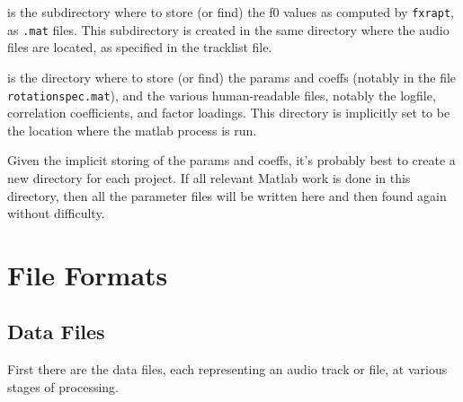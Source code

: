 \documentclass[11pt]{article}
\begin{document}
\begin{description}  \setlength{\itemsep}{0pt}\setlength{\parskip}{0pt}
\item[pitch cache] is the subdirectory where to store (or find) the f0
  values as computed by {\tt fxrapt}, as {\tt .mat} files.  This
  subdirectory is created in the same directory where the audio files
  are located, as specified in the tracklist file.
\item[parameter dir] is the directory where to store (or find) the
  params and coeffs (notably in the file {\tt rotationspec.mat}), and
  the various human-readable files, notably the logfile, correlation
  coefficients, and factor loadings.  This directory is implicitly set
  to be the location where the matlab process is run.
\end{description}

Given the implicit storing of the params and coeffs, it's probably
best to create a new directory for each project.  If all relevant
Matlab work is done in this directory, then all the parameter files
will be written here and then found again without difficulty.


\section{File Formats}        \label{sec:file-formats}

\subsection{Data Files}

First there are the data files, each representing an audio track or
file, at various stages of processing.
\end{document}
